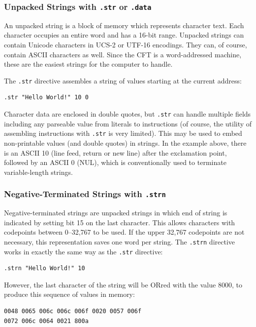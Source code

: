 \documentclass[11pt,a4paper,twocolumns]{article}
\newcommand\f[1]{{\color{black}\texttt{#1}}}
\newcommand\hex[1]{\textsf{#1}}
\begin{document}
\subsubsection{Unpacked Strings with \f{.str} or \f{.data}}

An unpacked string is a block of memory which represents character text. Each
character occupies an entire word and has a 16-bit range. Unpacked strings can
contain Unicode characters in UCS-2 or UTF-16 encodings. They can, of course,
contain ASCII characters as well. Since the CFT is a word-addressed machine,
these are the easiest strings for the computer to handle.

The \f{.str} directive assembles a string of values starting at the current
address:

\begin{verbatim}
.str "Hello World!" 10 0
\end{verbatim}

Character data are enclosed in double quotes, but \f{.str} can handle multiple
fields including any parseable value from literals to instructions (of course,
the utility of assembling instructions with \f{.str} is very limited). This may
be used to embed non-printable values (and double quotes) in strings. In the
example above, there is an ASCII 10 (line feed, return or new line) after the
exclamation point, followed by an ASCII 0 (NUL), which is conventionally used
to terminate variable-length strings.



\subsubsection{Negative-Terminated Strings with \f{.strn}}

Negative-terminated strings are unpacked strings in which end of string is
indicated by setting bit 15 on the last character. This allows characters with
codepoints between 0–32,767 to be used. If the upper 32,767 codepoints are not
necessary, this representation saves one word per string. The \f{.strn}
directive works in exactly the same way as the \f{.str} directive:

\begin{verbatim}
.strn "Hello World!" 10
\end{verbatim}

However, the last character of the string will be ORred with the value
\hex{8000}, to produce this sequence of values in memory:

\begin{verbatim}
0048 0065 006c 006c 006f 0020 0057 006f
0072 006c 0064 0021 800a
\end{verbatim}
\end{document}
